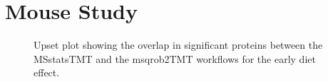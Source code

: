 \documentclass[
  letterpaper,
  DIV=11,
  numbers=noendperiod]{scrartcl}
\begin{document}
\section*{Mouse Study}

\begin{figure}[H]


\caption{\label{fig-Upset-early}Upset plot showing the overlap in
significant proteins between the MSstatsTMT and the msqrob2TMT workflows
for the early diet effect.}

\end{figure}%
\end{document}
